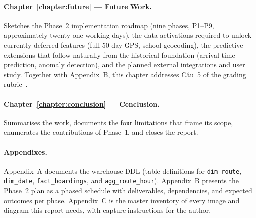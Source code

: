 \paragraph{Chapter~\ref{chapter:future} --- Future Work.}
Sketches the Phase~2 implementation roadmap (nine phases,
P1--P9, approximately twenty-one working days), the data
activations required to unlock currently-deferred features (full
50-day GPS, school geocoding), the predictive extensions that
follow naturally from the historical foundation
(arrival-time prediction, anomaly detection), and the planned
external integrations and user study. Together with
Appendix~B, this chapter addresses Câu~5 of the grading
rubric~\cite{rubric}.

\paragraph{Chapter~\ref{chapter:conclusion} --- Conclusion.}
Summarises the work, documents the four limitations that frame
its scope, enumerates the contributions of Phase~1, and closes
the report.

\paragraph{Appendixes.} Appendix~A documents the warehouse DDL
(table definitions for \texttt{dim\_route}, \texttt{dim\_date},
\texttt{fact\_boardings}, and \texttt{agg\_route\_hour}).
Appendix~B presents the Phase~2 plan as a phased schedule with
deliverables, dependencies, and expected outcomes per phase.
Appendix~C is the master inventory of every image and diagram
this report needs, with capture instructions for the author.

